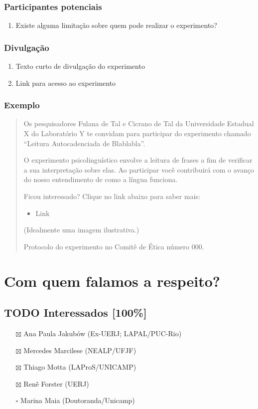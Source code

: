 \documentclass[11pt]{article}
\begin{document}
\subsubsection{Participantes potenciais}
\label{sec:org826be4e}
\begin{enumerate}
\item Existe alguma limitação sobre quem pode realizar o experimento?
\end{enumerate}

\subsubsection{Divulgação}
\label{sec:org6721649}
\begin{enumerate}
\item Texto curto de divulgação do experimento
\item Link para acesso ao experimento
\end{enumerate}

\subsubsection{Exemplo}
\label{sec:orgf640a11}
\begin{quote}
Os pesquisadores Fulana de Tal e Cicrano de Tal da Universidade Estadual X do Laboratório Y te convidam para participar do experimento chamado “Leitura Autocadenciada de Blablabla”.

O experimento psicolinguístico envolve a leitura de frases a fim de verificar a sua interpretação sobre elas. Ao participar você contribuirá com o avanço do nosso entendimento de como a língua funciona.

Ficou interessado? Clique no link abaixo para saber mais:
\begin{itemize}
\item Link
\end{itemize}

(Idealmente uma imagem ilustrativa.)

Protocolo do experimento no Comitê de Ética número 000.
\end{quote}

\section{Com quem falamos a respeito?}
\label{sec:org88b2fe6}
\subsection{{\bfseries\sffamily TODO} Interessados [100\%]}
\label{sec:org690d839}
\begin{itemize}
\item[{$\boxtimes$}] Ana Paula Jakubów (Ex-UERJ; LAPAL/PUC-Rio)
\item[{$\boxtimes$}] Mercedes Marcilese (NEALP/UFJF)
\item[{$\boxtimes$}] Thiago Motta (LAProS/UNICAMP)
\item[{$\boxtimes$}] Renê Forster (UERJ)
\item[{$\square$}] Marina Maia (Doutoranda/Unicamp)
\end{itemize}
\end{document}
